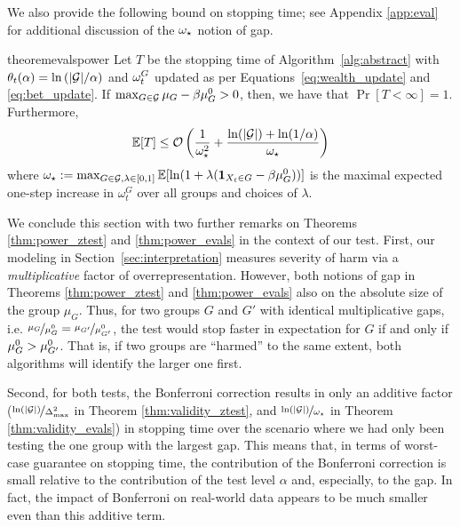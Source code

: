 We also provide the following bound on stopping time; see Appendix \ref{app:eval} for additional discussion of the $\omega_\star$ notion of gap. 
\begin{restatable}[Power]{theorem}{evalspower} 
\label{thm:power_evals}
Let $T$ be the stopping time of Algorithm~\ref{alg:abstract} with $\theta_t(\alpha) = \ln{(|{\mathcal{G}}|/\alpha)}$ and $\omega_t^G$ updated as per Equations~\eqref{eq:wealth_update} and \eqref{eq:bet_update}. If $\max_{G \in {\mathcal{G}}} \mu_G - \beta{\mu_G^0} > 0$, then, we have that $\Pr[T < \infty] = 1$. Furthermore, 
\[
\mathbb{E}[T] \leq \mathcal{O}\left(\frac{1}{\omega_\star^2} + \frac{\ln(|{\mathcal{G}}|) + \ln(1/\alpha)}{\omega_\star}\right)
\]
where $\omega_\star := \max_{G\in\mathcal{G}, \lambda\in[0,1]}\mathbb{E}[\ln(1+ \lambda(\mathbf{1}_{X_t\in G} -\beta{\mu_G^0}))]$ is the maximal expected one-step increase in $\omega_t^G$ over all groups and choices of $\lambda$.
\end{restatable}
We conclude this section with two further remarks on Theorems \ref{thm:power_ztest} and \ref{thm:power_evals} in the context of our test. First, our modeling in Section~\ref{sec:interpretation} measures severity of harm via a \textit{multiplicative} factor of overrepresentation.
However, both notions of gap in Theorems \ref{thm:power_ztest} and \ref{thm:power_evals} also on the absolute size of the group $\mu_G$.
Thus, for two groups $G$ and $G'$ with identical multiplicative gaps, i.e. $\nicefrac{\mu_G}{{\mu_G^0}} = \nicefrac{\mu_{G'}}{\mu_{G'}^0}$, the test would stop faster in expectation for $G$ if and only if ${\mu_G^0} > \mu_{G'}^0$. That is, if two groups are ``harmed'' to the same extent, both algorithms will identify the larger one first. 

Second, for both tests, the Bonferroni correction results in only an additive factor ($\nicefrac{\ln(|{\mathcal{G}}|)}{\Delta_{\max}^2}$ in Theorem \ref{thm:validity_ztest}, and $\nicefrac{\ln(|{\mathcal{G}}|)}{\omega_\star}$ in Theorem \ref{thm:validity_evals}) in stopping time over the scenario where we had only been testing the one group with the largest gap. 
This means that, in terms of worst-case guarantee on stopping time, the contribution of the Bonferroni correction is small relative to the contribution of the test level $\alpha$ and, especially, to the gap. In fact, the impact of Bonferroni on real-world data appears to be much smaller even than this additive term.
